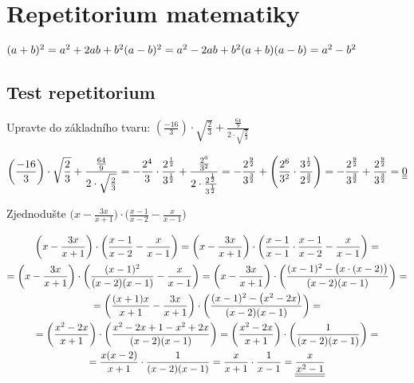 

 \section*{Repetitorium matematiky}
\(
(a+b)^2 = a^2 +2ab + b^2 \\
(a-b)^2 = a^2 -2ab + b^2 \\
(a+b)(a-b) = a^2 - b^2
\)
\subsection*{Test repetitorium} 
\begin{example}
    Upravte do základního tvaru: $\left(
        \frac{-16}{3}
    \right) \cdot 
    \sqrt{
        \frac{2}{3}} + 
        \frac{\frac{64}{9}}
        {2\cdot\sqrt{\frac{2}{3}}}$
\end{example}
\begin{gather*}
    \left(
        \frac{-16}{3}
    \right) \cdot 
    \sqrt{
        \frac{2}{3}} + 
        \frac{\frac{64}{9}}
        {2\cdot\sqrt{\frac{2}{3}}} = 
         - \frac{2^4}{3} \cdot \frac{2^\frac{1}{2}}{3^\frac{1}{2}} + \frac{\frac{2^6}{3^2}}{2 \cdot \frac{2^\frac{1}{2}}{3^\frac{1}{2}}} 
        = - \frac{2^\frac{9}{2}}{3^\frac{3}{2}} + \left( \frac{2^6}{3^2} \cdot \frac{3^\frac{1}{2}}{2^\frac{3}{2}} \right)
        = - \frac{2^\frac{9}{2}}{3^\frac{3}{2}} + \frac{2^\frac{9}{2}}{3^\frac{3}{2}} = \underline{\underline{0}}
\end{gather*}
\begin{example}
    Zjednodušte $\biggl( x-\frac{3x}{x+1} \biggr)\cdot 
    \biggl( \frac{x-1}{x-2} - \frac{x}{x-1} \biggr) $
\end{example}
\begin{gather*}
    \biggl( x-\frac{3x}{x+1} \biggr)\cdot 
    \biggl( \frac{x-1}{x-2} - \frac{x}{x-1} \biggr) = 
    \biggl( x-\frac{3x}{x+1} \biggr)\cdot 
    \biggl(\frac{x-1}{x-1} \cdot \frac{x-1}{x-2} - \frac{x}{x-1} \biggr) = \\
     = \biggl( x-\frac{3x}{x+1} \biggr)\cdot 
    \biggl( \frac{(x-1)^2}{(x-2)(x-1)} - \frac{x}{x-1} \biggr) = 
    \biggl( x-\frac{3x}{x+1} \biggr)\cdot 
    \biggl( \frac{(x-1)^2 - \bigl(x \cdot (x-2)\bigr)}{(x-2)(x-1)}\biggr) =
    \\  
    = \biggl(\frac{(x+1)x}{x+1} -\frac{3x}{x+1} \biggr)\cdot 
    \biggl( \frac{(x-1)^2 - \bigl(x^2-2x\bigr)}{(x-2)(x-1)}\biggr) =
    \\
    = \biggl(
        \frac{x^2-2x}{x+1} 
    \biggr) \cdot 
    \biggl(
        \frac{x^2-2x+1-x^2+2x}{(x-2)(x-1)}
    \biggr) = \biggl(
        \frac{x^2-2x}{x+1}
    \biggr) \cdot \biggl(
        \frac{1}{(x-2)(x-1)}
    \biggr) = \\=   \frac{x(x-2)}{x+1}  \cdot \frac{1}{(x-2)(x-1)} = \frac{x}{x+1} \cdot \frac{1}{x-1} = \underline{\underline{\frac{x}{x^2-1}}}
\end{gather*}
